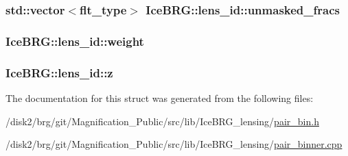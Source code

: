 \hypertarget{structIceBRG_1_1lens__id_a9a3d312cb37f480aa07d94e5a39d714b}{
\subsubsection[{unmasked\-\_\-fracs}]{\setlength{\rightskip}{0pt plus 5cm}std\-::vector$<${\bf flt\-\_\-type}$>$ Ice\-B\-R\-G\-::lens\-\_\-id\-::unmasked\-\_\-fracs}}\label{structIceBRG_1_1lens__id_a9a3d312cb37f480aa07d94e5a39d714b}
\hypertarget{structIceBRG_1_1lens__id_ab1474c2d0c19469e6bb8c333b2123586}{
\subsubsection[{weight}]{ Ice\-B\-R\-G\-::lens\-\_\-id\-::weight}}\label{structIceBRG_1_1lens__id_ab1474c2d0c19469e6bb8c333b2123586}
\hypertarget{structIceBRG_1_1lens__id_aedfbb8478463687a0aa5982105a9f8fc}{
\subsubsection[{z}]{ Ice\-B\-R\-G\-::lens\-\_\-id\-::z}}\label{structIceBRG_1_1lens__id_aedfbb8478463687a0aa5982105a9f8fc}


The documentation for this struct was generated from the following files\-:\begin{DoxyCompactItemize}
\item 
/disk2/brg/git/\-Magnification\-\_\-\-Public/src/lib/\-Ice\-B\-R\-G\-\_\-lensing/\hyperlink{pair__bin_8h}{pair\-\_\-bin.\-h}\item 
/disk2/brg/git/\-Magnification\-\_\-\-Public/src/lib/\-Ice\-B\-R\-G\-\_\-lensing/\hyperlink{pair__binner_8cpp}{pair\-\_\-binner.\-cpp}\end{DoxyCompactItemize}
